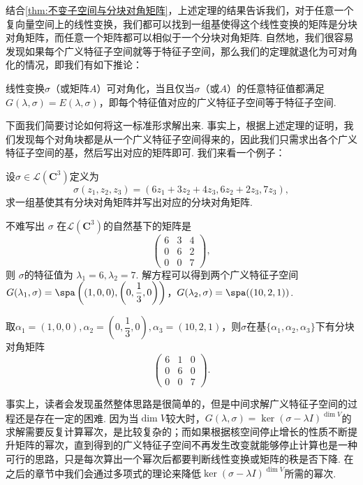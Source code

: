 结合\autoref{thm:不变子空间与分块对角矩阵}，上述定理的结果告诉我们，对于任意一个复向量空间上的线性变换，我们都可以找到一组基使得这个线性变换的矩阵是分块对角矩阵，而任意一个矩阵都可以相似于一个分块对角矩阵. 自然地，我们很容易发现如果每个广义特征子空间就等于特征子空间，那么我们的定理就退化为可对角化的情况，即我们有如下推论：
\begin{corollary}{}{}
    线性变换$\sigma$（或矩阵$A$）可对角化，当且仅当$\sigma$（或$A$）的任意特征值都满足$G(\lambda,\sigma)=E(\lambda,\sigma)$，即每个特征值对应的广义特征子空间等于特征子空间.
\end{corollary}

下面我们简要讨论如何将这一标准形求解出来. 事实上，根据上述定理的证明，我们发现每个对角块都是从一个广义特征子空间得来的，因此我们只需求出各个广义特征子空间的基，然后写出对应的矩阵即可. 我们来看一个例子：
\begin{example}{}{}
    设$\sigma\in \mathcal{L}(\mathbf{C}^3)$定义为
    \[\sigma(z_1,z_2,z_3)=(6z_1+3z_2+4z_3,6z_2+2z_3,7z_3),\]求一组基使其有分块对角矩阵并写出对应的分块对角矩阵.
\end{example}

\begin{solution}
    不难写出 $\sigma$ 在$\mathcal{L}(\mathbf{C}^3)$的自然基下的矩阵是
    \[ \begin{pmatrix}
        6 & 3 & 4 \\
        0 & 6 & 2 \\
        0 & 0 & 7
    \end{pmatrix}, \]
    则 $\sigma$的特征值为 $\lambda_1 = 6,\lambda_2 = 7$. 解方程可以得到两个广义特征子空间 $G(\lambda_1,\sigma) = \spa\left((1,0,0),\left(0,\dfrac{1}{3},0\right)\right)$，$G(\lambda_2,\sigma)=\spa((10,2,1))$.

    取$\alpha_1=(1,0,0),\alpha_2=\left(0,\dfrac{1}{3},0\right),\alpha_3=(10,2,1)$，则$\sigma$在基$\{\alpha_1,\alpha_2,\alpha_3\}$下有分块对角矩阵
    \[ \begin{pmatrix}
        6 & 1 & 0 \\
        0 & 6 & 0 \\
        0 & 0 & 7
    \end{pmatrix}. \]
\end{solution}

事实上，读者会发现虽然整体思路是很简单的，但是中间求解广义特征子空间的过程还是存在一定的困难. 因为当$\dim V$较大时，$G(\lambda,\sigma)=\ker (\sigma-\lambda I)^{\dim V}$的求解需要反复计算幂次，是比较复杂的；而如果根据核空间停止增长的性质不断提升矩阵的幂次，直到得到的广义特征子空间不再发生改变就能够停止计算也是一种可行的思路，只是每次算出一个幂次后都要判断线性变换或矩阵的秩是否下降. 在之后的章节中我们会通过多项式的理论来降低$\ker (\sigma-\lambda I)^{\dim V}$所需的幂次.

